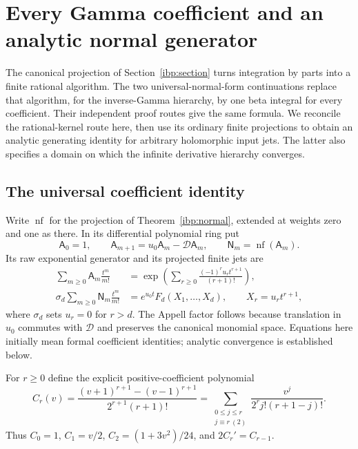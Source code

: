 \section{Every Gamma coefficient and an analytic normal generator}
\label{ung:section}

The canonical projection of Section~\ref{ibp:section} turns integration
by parts into a finite rational algorithm. The two universal-normal-form
continuations \cite{ung:reports} replace that algorithm, for the inverse-Gamma
hierarchy, by one beta integral for every coefficient. Their independent
proof routes give the same formula. We reconcile the rational-kernel route
here, then use its ordinary finite projections to obtain an analytic
generating identity for arbitrary holomorphic input jets. The latter also
specifies a domain on which the infinite derivative hierarchy converges.

\subsection{The universal coefficient identity}

Write $\operatorname{nf}$ for the projection of
Theorem~\ref{ibp:normal}, extended at weights zero and one as there.
In its differential polynomial ring put
\[
 \mathsf A_0=1,\qquad \mathsf A_{m+1}=u_0\mathsf A_m-\mathcal D\mathsf A_m,
 \qquad \mathsf N_m=\operatorname{nf}(\mathsf A_m).
\]
Its raw exponential generator and its projected finite jets are
\begin{align}
 \sum_{m\ge0}\mathsf A_m\frac{t^m}{m!}
 &=\exp\left(\sum_{r\ge0}\frac{(-1)^r u_rt^{r+1}}{(r+1)!}\right),
 \label{ung:raw}\\
 \sigma_d\sum_{m\ge0}\mathsf N_m\frac{t^m}{m!}
 &=e^{u_0t}F_d(X_1,\ldots,X_d),\qquad X_r=u_rt^{r+1},
 \label{ung:finite}
\end{align}
where $\sigma_d$ sets $u_r=0$ for $r>d$. The Appell factor follows
because translation in $u_0$ commutes with $\mathcal D$ and preserves
the canonical monomial space. Equations here initially mean formal
coefficient identities; analytic convergence is established below.

For $r\ge0$ define the explicit positive-coefficient polynomial
\begin{equation}\label{ung:C}
 C_r(v)=\frac{(v+1)^{r+1}-(v-1)^{r+1}}{2^{r+1}(r+1)!}
 =\sum_{\substack{0\le j\le r\\j\equiv r\ (2)}}
                   \frac{v^j}{2^rj!(r+1-j)!}.
\end{equation}
Thus $C_0=1$, $C_1=v/2$, $C_2=(1+3v^2)/24$,
and $2C_r'=C_{r-1}$.

